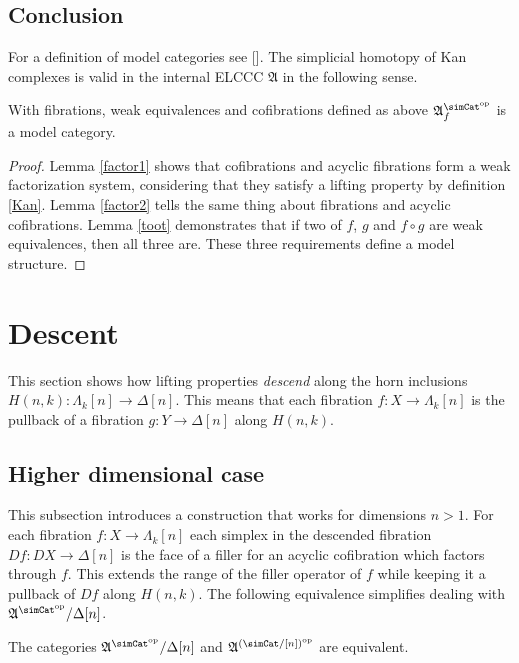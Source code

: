 \documentclass{tac}
\newcommand\hide[1]{}
\newcommand\dual{^{\mathrm{op}}}
\newcommand\s{^{\simCat\dual}}
\newcommand\of{:}
\newcommand\simplex\Delta
\newcommand\horn\Lambda
\newcommand\f{_f}
\newcommand\ambient{\mathfrak A}
\begin{document}
\subsection{Conclusion}
For a definition of model categories see [\cite{Hovey99, GJSHT}]. The simplicial homotopy of Kan complexes is valid in the internal ELCCC $\ambient$ in the following sense.

\begin{theorem}
With fibrations, weak equivalences and cofibrations defined as above $\ambient\s\f$ is a model category.
\label{model category}
\end{theorem}

\begin{proof}
Lemma \ref{factor1} shows that cofibrations and acyclic fibrations form a weak factorization system, considering that they satisfy a lifting property by definition \ref{Kan}. Lemma \ref{factor2} tells the same thing about fibrations and acyclic cofibrations. Lemma \ref{toot} demonstrates that if two of $f$, $g$ and $f\circ g$ are weak equivalences, then all three are. These three requirements define a model structure.
\end{proof}

\section{Descent} %
This section shows how lifting properties \emph{descend} along the horn inclusions $H(n,k)\of \horn_k[n]\to\simplex[n]$. This means that each fibration $f\of X\to\horn_k[n]$ is the pullback of a fibration $g\of Y\to\simplex[n]$ along $H(n,k)$.

\subsection{Higher dimensional case}
This subsection introduces a construction that works for dimensions $n>1$. For each fibration $f\of X\to \horn_k[n]$ each simplex in the descended fibration $Df\of DX\to \simplex[n]$ is the face of a filler for an acyclic cofibration which factors through $f$. This extends the range of the filler operator of $f$ while keeping it a pullback of $Df$ along $H(n,k)$. The following equivalence simplifies dealing with $\ambient\s/\simplex[n]$.

\hide{ this bit scares me. Has it actually gotten harder though? }
\begin{lemma} The categories $\ambient\s/\simplex[n]$ and $\ambient^{(\simCat/[n])\dual}$ are equivalent. \label{slice equivalence} \end{lemma}
\end{document}

